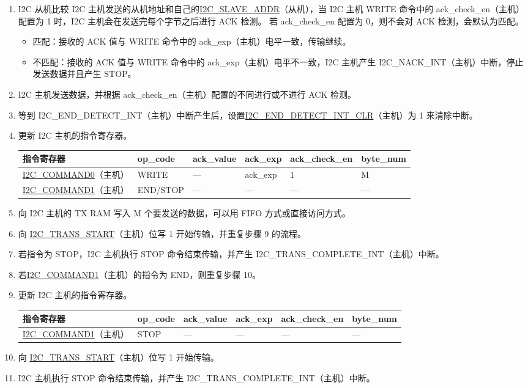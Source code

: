 \documentclass[main\_\_CN.tex]{subfiles}
\begin{document}
\begin{enumerate}
\item I2C 从机比较 I2C 主机发送的从机地址和自己的\hyperref[fielddesc:I2CSLAVEADDR]{I2C\_SLAVE\_ADDR}（从机），当 I2C 主机 WRITE 命令中的 ack\_check\_en（主机）配置为 1 时，I2C 主机会在发送完每个字节之后进行 ACK 检测。 若 ack\_check\_en 配置为 0，则不会对 ACK 检测，会默认为匹配。
\begin{itemize}
\item 匹配：接收的 ACK 值与 WRITE 命令中的 ack\_exp（主机）电平一致，传输继续。
\item 不匹配：接收的 ACK 值与 WRITE 命令中的 ack\_exp（主机）电平不一致，I2C 主机产生 I2C\_NACK\_INT（主机）中断，停止发送数据并且产生 STOP。
\end{itemize}

\item I2C 主机发送数据，并根据 ack\_check\_en（主机）配置的不同进行或不进行 ACK 检测。

\item 等到 I2C\_END\_DETECT\_INT（主机）中断产生后，设置\hyperref[fielddesc:I2CENDDETECTINTCLR]{I2C\_END\_DETECT\_INT\_CLR}（主机）为 1 来清除中断。
\item 更新 I2C 主机的指令寄存器。
\begin{longtable}{ | p{4cm} | p{2cm} | p{2cm} | p{2cm} |p{2cm} | p{2cm} |}
\hline\rowcolor{lightgray}
指令寄存器& op\_code & ack\_value&ack\_exp&ack\_check\_en&byte\_num  \\ \hline
\hyperref[fielddesc:I2CCOMMAND0]{I2C\_COMMAND0}（主机）& WRITE& ---&ack\_exp&1&M  \\ \hline
\hyperref[fielddesc:I2CCOMMAND1]{I2C\_COMMAND1}（主机）& END/STOP& ---&---&---&---  \\ \hline
\end{longtable}
\item 向 I2C 主机的 TX RAM 写入 M 个要发送的数据，可以用 FIFO 方式或直接访问方式。
\item 向 \hyperref[fielddesc:I2CTRANSSTART]{I2C\_TRANS\_START}（主机）位写 1 开始传输，并重复步骤 9 的流程。
\item 若指令为 STOP，I2C 主机执行 STOP 命令结束传输，并产生 I2C\_TRANS\_COMPLETE\_INT（主机）中断。
\item 若\hyperref[fielddesc:I2CCOMMAND1]{I2C\_COMMAND1}（主机）的指令为 END，则重复步骤 10。
\item 更新 I2C 主机的指令寄存器。
\begin{longtable}{ | p{4cm} | p{2cm} | p{2cm} | p{2cm} |p{2cm} | p{2cm} |}
\hline\rowcolor{lightgray}
指令寄存器& op\_code & ack\_value&ack\_exp&ack\_check\_en&byte\_num  \\ \hline
\hyperref[fielddesc:I2CCOMMAND1]{I2C\_COMMAND1}（主机）& STOP& ---&---&---&---  \\ \hline
\end{longtable}
\item 向 \hyperref[fielddesc:I2CTRANSSTART]{I2C\_TRANS\_START}（主机）位写 1 开始传输。
\item I2C 主机执行 STOP 命令结束传输，并产生 I2C\_TRANS\_COMPLETE\_INT（主机）中断。

\end{enumerate}
\end{document}
